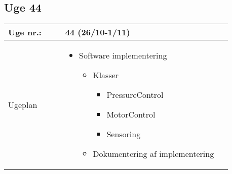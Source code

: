 	\subsection{Uge 44}
	\begin{longtable}{|p{0.24\linewidth}|p{0.7\linewidth}|}
		\hline
		Uge nr.: & 44 (26/10-1/11)\\ \hline
		Ugeplan & 
		\begin{itemize}
			\item Software implementering
			\begin{itemize}
				\item Klasser
				\begin{itemize}
					\item PressureControl
					\item MotorControl
					\item Sensoring
				\end{itemize}
				\item Dokumentering af implementering
			\end{itemize}
		\end{itemize}
		

\end{longtable}
